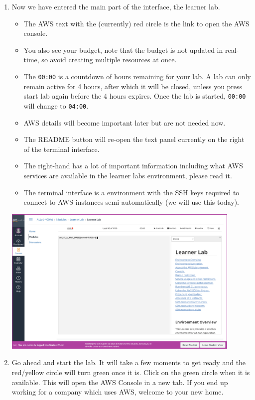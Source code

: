 \documentclass{csse4400}
\begin{document}
\begin{enumerate}
\item Now we have entered the main part of the interface, the learner lab.
\begin{itemize}
      \item The AWS text with the (currently) red circle is the link to open the AWS console.
      \item You also see your budget, note that the budget is not updated in real-time, so avoid creating multiple resources at once.
      \item The \texttt{00:00} is a countdown of hours remaining for your lab.
      A lab can only remain active for 4 hours, after which it will be closed, unless you press start lab again before the 4 hours expires.
      Once the lab is started, \texttt{00:00} will change to \texttt{04:00}.
      \item AWS details will become important later but are not needed now.
      \item The README button will re-open the text panel currently on the right of the terminal interface.
      \item The right-hand has a lot of important information including what AWS services are available in the learner labs environment, please read it.
      \item The terminal interface is a environment with the SSH keys required to connect to AWS instances semi-automatically (we will use this today).
\end{itemize}

\includegraphics[width=0.9\textwidth]{images/lab-interface}

\item Go ahead and start the lab. It will take a few moments to get ready and the red/yellow circle will turn green once it is.
      Click on the green circle when it is available.
      This will open the AWS Console in a new tab.
      If you end up working for a company which uses AWS, welcome to your new home.


\end{enumerate}
\end{document}
